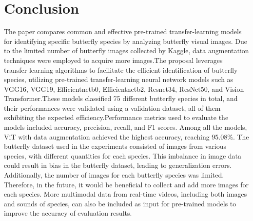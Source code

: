 \documentclass[10pt,twocolumn,letterpaper]{article}
\begin{document}
\section{Conclusion} 
The paper compares common and effective pre-trained transfer-learning models for identifying specific butterfly species by analyzing butterfly visual images. Due to the limited number of butterfly images collected by Kaggle, data augmentation techniques were employed to acquire more images.The proposal leverages transfer-learning algorithms to facilitate the efficient identification of butterfly species, utilizing pre-trained transfer-learning neural network models such as VGG16, VGG19, Efficientnetb0, Efficientnetb2, Resnet34, ResNet50, and Vision Transformer.These models classified 75 different butterfly species in total, and their performances were validated using a validation dataset, all of them exhibiting the expected efficiency.Performance metrics used to evaluate the models included accuracy, precision, recall, and F1 scores. Among all the models, ViT with data augmentation achieved the highest accuracy, reaching 95.08\%. The butterfly dataset used in the experiments consisted of images from various species, with different quantities for each species. This imbalance in image data could result in bias in the butterfly dataset, leading to generalization errors. Additionally, the number of images for each butterfly species was limited. Therefore, in the future, it would be beneficial to collect and add more images for each species. More multimodal data from real-time videos, including both images and sounds of species, can also be included as input for pre-trained models to improve the accuracy of evaluation results.










	{\small
		
		
	}
\end{document}
